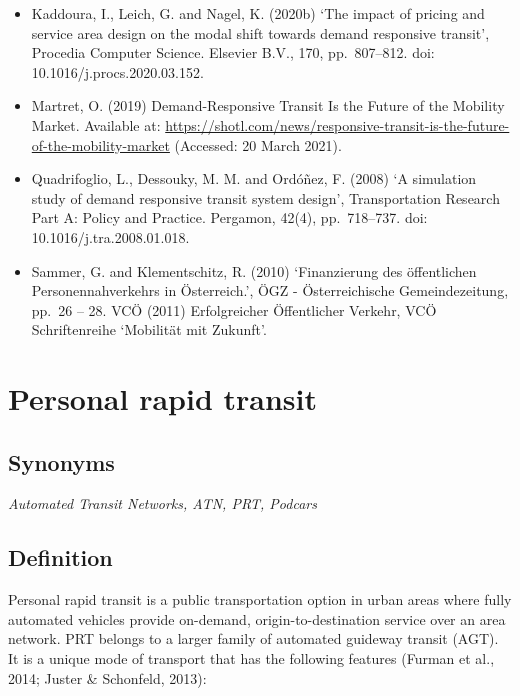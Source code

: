 \documentclass[
]{book}
\begin{document}
\begin{itemize}
\item
  Kaddoura, I., Leich, G. and Nagel, K. (2020b) `The impact of pricing and service area design on the modal shift towards demand responsive transit', Procedia Computer Science. Elsevier B.V., 170, pp.~807--812. doi: 10.1016/j.procs.2020.03.152.
\item
  Martret, O. (2019) Demand-Responsive Transit Is the Future of the Mobility Market. Available at: \url{https://shotl.com/news/responsive-transit-is-the-future-of-the-mobility-market} (Accessed: 20 March 2021).
\item
  Quadrifoglio, L., Dessouky, M. M. and Ordóñez, F. (2008) `A simulation study of demand responsive transit system design', Transportation Research Part A: Policy and Practice. Pergamon, 42(4), pp.~718--737. doi: 10.1016/j.tra.2008.01.018.
\item
  Sammer, G. and Klementschitz, R. (2010) `Finanzierung des öffentlichen Personennahverkehrs in Österreich.', ÖGZ - Österreichische Gemeindezeitung, pp.~26 -- 28.
  VCÖ (2011) Erfolgreicher Öffentlicher Verkehr, VCÖ Schriftenreihe `Mobilität mit Zukunft'.
\end{itemize}

\hypertarget{prt}{%
\section{Personal rapid transit}\label{prt}}

\hypertarget{synonyms-21}{%
\subsection*{Synonyms}\label{synonyms-21}}

\emph{Automated Transit Networks, ATN, PRT, Podcars}

\hypertarget{definition-24}{%
\subsection*{Definition}\label{definition-24}}

Personal rapid transit is a public transportation option in urban areas where fully automated vehicles provide on-demand, origin-to-destination service over an area network. PRT belongs to a larger family of automated guideway transit (AGT). It is a unique mode of transport that has the following features (Furman et al., 2014; Juster \& Schonfeld, 2013):
\end{document}
